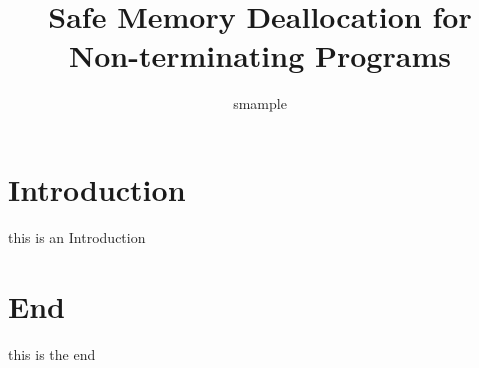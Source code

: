 \documentclass[english]{jssst_ppl} %
\title{Safe Memory Deallocation for Non-terminating Programs}
\author{smample}
\begin{document}
\maketitle
\begin{abstract}

\end{abstract}

\section{Introduction}
 this is an Introduction

\section{End}
this is the end
\end{document}
